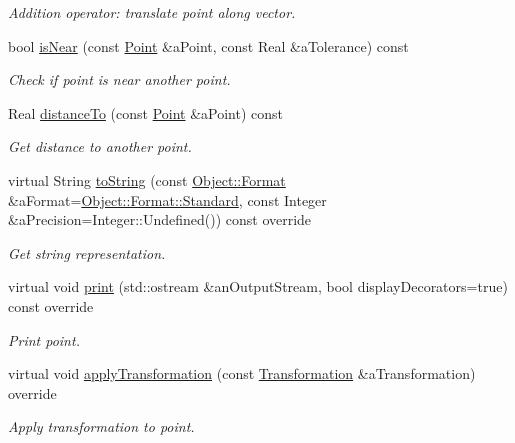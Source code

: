 \begin{DoxyCompactItemize}
\begin{DoxyCompactList}\small\item\em Addition operator\+: translate point along vector. \end{DoxyCompactList}\item 
bool \hyperlink{classlibrary_1_1math_1_1geom_1_1d2_1_1objects_1_1_point_aeec1bab241792dc6b6091d9cac36d02e}{is\+Near} (const \hyperlink{classlibrary_1_1math_1_1geom_1_1d2_1_1objects_1_1_point}{Point} \&a\+Point, const Real \&a\+Tolerance) const
\begin{DoxyCompactList}\small\item\em Check if point is near another point. \end{DoxyCompactList}\item 
Real \hyperlink{classlibrary_1_1math_1_1geom_1_1d2_1_1objects_1_1_point_a1615c904b4f5a1c406cdba97df6445d8}{distance\+To} (const \hyperlink{classlibrary_1_1math_1_1geom_1_1d2_1_1objects_1_1_point}{Point} \&a\+Point) const
\begin{DoxyCompactList}\small\item\em Get distance to another point. \end{DoxyCompactList}\item 
virtual String \hyperlink{classlibrary_1_1math_1_1geom_1_1d2_1_1objects_1_1_point_ae645a37f426dac123d566fb5511d595d}{to\+String} (const \hyperlink{classlibrary_1_1math_1_1geom_1_1d2_1_1_object_ac8cd61dada4960cfee9a469231621b17}{Object\+::\+Format} \&a\+Format=\hyperlink{classlibrary_1_1math_1_1geom_1_1d2_1_1_object_ac8cd61dada4960cfee9a469231621b17aeb6d8ae6f20283755b339c0dc273988b}{Object\+::\+Format\+::\+Standard}, const Integer \&a\+Precision=Integer\+::\+Undefined()) const override
\begin{DoxyCompactList}\small\item\em Get string representation. \end{DoxyCompactList}\item 
virtual void \hyperlink{classlibrary_1_1math_1_1geom_1_1d2_1_1objects_1_1_point_a74bef6325d728e1cb6e70bac0b8d4601}{print} (std\+::ostream \&an\+Output\+Stream, bool display\+Decorators=true) const override
\begin{DoxyCompactList}\small\item\em Print point. \end{DoxyCompactList}\item 
virtual void \hyperlink{classlibrary_1_1math_1_1geom_1_1d2_1_1objects_1_1_point_a71d3ef79dbffcd2568d1a2c6bad807d7}{apply\+Transformation} (const \hyperlink{classlibrary_1_1math_1_1geom_1_1d2_1_1_transformation}{Transformation} \&a\+Transformation) override
\begin{DoxyCompactList}\small\item\em Apply transformation to point. \end{DoxyCompactList}\end{DoxyCompactItemize}
